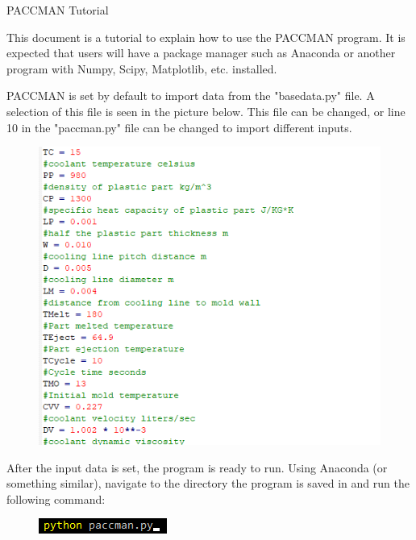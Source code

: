 \documentclass[a4paper,12pt]{article}
\begin{document}
\setlength{\parindent}{0em}
\doublespacing

\begin{center}
{\huge PACCMAN Tutorial}
\end{center}

\bigskip
\bigskip


This document is a tutorial to explain how to use the PACCMAN program. It is expected that users will have a package manager such as Anaconda or another program with Numpy, Scipy, Matplotlib, etc. installed.

\medskip

PACCMAN is set by default to import data from the "basedata.py" file. A selection of this file is seen in the picture below. This file can be changed, or line 10 in the "paccman.py" file can be changed to import different inputs.

\begin{center}
\begin{figure}[h]
\centering
\includegraphics{tutorialimage1.png}
\end{figure}
\end{center}

\clearpage

After the input data is set, the program is ready to run. Using Anaconda (or something similar), navigate to the directory the program is saved in and run the following command:

\begin{center}
\begin{figure}[h]
\centering
\includegraphics{tutorialimage2.png}
\end{figure}
\end{center}
\end{document}
